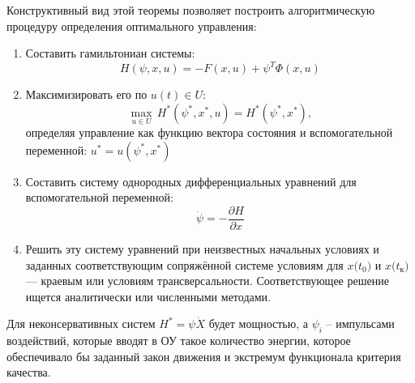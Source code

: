 \documentclass[preprint,russian,a5paper,10pt,twoside,mediummath]{ncc}
\begin{document}
Конструктивный вид этой теоремы позволяет построить алгоритмическую процедуру определения оптимального управления:
\begin{enumerate}
\item Составить гамильтониан системы:
\[ H(\psi , x, u) = -F(x,u) + \psi ^T \Phi (x,u) \]
\item Максимизировать его по $ u(t) \in U $:
\[ \underset{u \in U}{ \max } \, H^* ( \psi ^*, x^*, u ) = H^* ( \psi ^*, x^* ), \]
определяя управление как функцию вектора состояния и вспомогательной переменной: $ u^* = u ( \psi ^*, x^* ) $
\item Составить систему однородных дифференциальных уравнений для вспомогательной переменной:
\[ \dot{\psi } = -\frac{\partial H}{\partial x} \]
\item Решить эту систему уравнений при неизвестных начальных условиях и заданных соответствующим сопряжённой системе условиям для $ x \bigl( t_0 \bigr) $ и $ x \bigl( t_\textit{к} \bigr) $ --- краевым или условиям трансверсальности. Соответствующее решение ищется аналитически или численными методами.
\end{enumerate}

Для неконсервативных систем $ H^* = \psi \dot{X} $ будет мощностью, а $ \psi _i $ \--- импульсами воздействий, которые вводят в ОУ такое количество энергии, которое обеспечивало бы заданный закон движения и экстремум функционала критерия качества.
\end{document}
